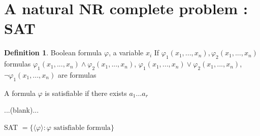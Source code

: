 \documentclass{article}
\theoremstyle{definition}
\newtheorem{definition}{Definition}
\theoremstyle{remark}
\begin{document}
\section{A natural NR complete problem : SAT}
\begin{definition}
	Boolean formula $\varphi$,
	a variable $x_i$
	If $\varphi_1(x_1,...,x_n), \varphi_2(x_1,...,x_n)$ formulas
	$\varphi_1(x_1,...,x_n) \wedge \varphi_2(x_1,...,x_n)$,
	$\varphi_1(x_1,...,x_n) \vee \varphi_2(x_1,...,x_n)$,
	$\neg \varphi_1(x_1,...,x_n)$ are formulas
	
	A formula $\varphi$ is satisfiable  if there exists $a_1...a_r$
	
	...(blank)...
	
	SAT $ = \{\langle\varphi\rangle : \varphi \text{ satisfiable formula}\}$
\end{definition}
\end{document}
